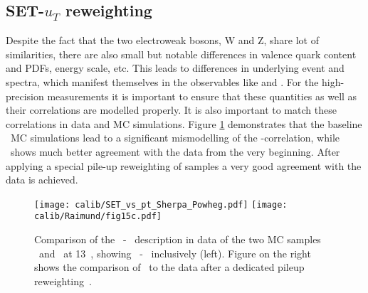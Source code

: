      \subsection{SET-$u_T$ reweighting }
     Despite the fact that the two electroweak bosons, W and Z, share  lot of similarities, there are also small but notable differences in valence quark content and PDFs, energy scale, etc. This leads to differences in underlying event and \ptv spectra, which manifest themselves in the observables like \set and \setue. For the high-precision measurements it is important to ensure that these quantities as well as their correlations are modelled properly. It is also important to match these correlations in data and MC simulations. Figure \ref{fig:setSherpa} demonstrates that the baseline \Powheg~MC simulations lead to a significant mismodelling of the \setue-\ptz correlation, while \Sherpa~shows much better agreement with the data from the very beginning. After applying a special pile-up reweighting of \Sherpa samples a very good agreement with the data is achieved.
     
	\begin{figure}[tp]
		\centering
			\texttt{[image: calib/SET\_vs\_pt\_Sherpa\_Powheg.pdf]}
			\texttt{[image: calib/Raimund/fig15c.pdf]}
		\caption{Comparison of the \set\ - \ptll\ description in data of the two MC
			samples \POWHEG\ and \SHERPA\ at 13~\TeV, showing \set\ - \ptll\ inclusively
			(left). Figure on the right shows the comparison of \SHERPA\ to the data after a dedicated
			pileup reweighting~\cite{int_note_hr}. }
		\label{fig:setSherpa}
	\end{figure}
	
